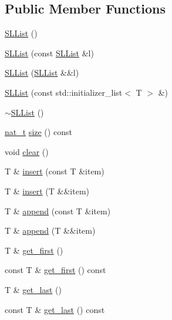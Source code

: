 \subsection*{Public Member Functions}
\begin{DoxyCompactItemize}
\item 
\hyperlink{class_designar_1_1_s_l_list_a160cad3715f206687cde5b49906f225c}{S\+L\+List} ()
\item 
\hyperlink{class_designar_1_1_s_l_list_a83b424655f5d08295fda2ee17e9b5024}{S\+L\+List} (const \hyperlink{class_designar_1_1_s_l_list}{S\+L\+List} \&l)
\item 
\hyperlink{class_designar_1_1_s_l_list_adb47b41f1d0117989a2b5f8b477a8333}{S\+L\+List} (\hyperlink{class_designar_1_1_s_l_list}{S\+L\+List} \&\&l)
\item 
\hyperlink{class_designar_1_1_s_l_list_aae2e56e0b19b4a35dd0e5babed724d04}{S\+L\+List} (const std\+::initializer\+\_\+list$<$ T $>$ \&)
\item 
\hyperlink{class_designar_1_1_s_l_list_a129557e3a5b4555ac45ccae8aaa89f03}{$\sim$\+S\+L\+List} ()
\item 
\hyperlink{namespace_designar_aa72662848b9f4815e7bf31a7cf3e33d1}{nat\+\_\+t} \hyperlink{class_designar_1_1_s_l_list_a1c98e196a2e6d565efff444a590eaf49}{size} () const
\item 
void \hyperlink{class_designar_1_1_s_l_list_a510c26d3fa25eda352665f59c65cb41f}{clear} ()
\item 
T \& \hyperlink{class_designar_1_1_s_l_list_a4a016c1bb14040d6abb8b8eee81b71e9}{insert} (const T \&item)
\item 
T \& \hyperlink{class_designar_1_1_s_l_list_aea19d4f4eed343c1fe28517de0368be9}{insert} (T \&\&item)
\item 
T \& \hyperlink{class_designar_1_1_s_l_list_ae2df2707dddd8c7af8e8d878e1fb58fa}{append} (const T \&item)
\item 
T \& \hyperlink{class_designar_1_1_s_l_list_a2eba31f3a7629a3d96bc87f720f79918}{append} (T \&\&item)
\item 
T \& \hyperlink{class_designar_1_1_s_l_list_ab4e0f44fe834563d47f36aab670b8c83}{get\+\_\+first} ()
\item 
const T \& \hyperlink{class_designar_1_1_s_l_list_a2924b50936033843d23b2d384e751953}{get\+\_\+first} () const
\item 
T \& \hyperlink{class_designar_1_1_s_l_list_ae56fe90795b8fb280bc7361a2426fe53}{get\+\_\+last} ()
\item 
const T \& \hyperlink{class_designar_1_1_s_l_list_add24dd761d9c1ed77a028889beb560c2}{get\+\_\+last} () const

\end{DoxyCompactItemize}

